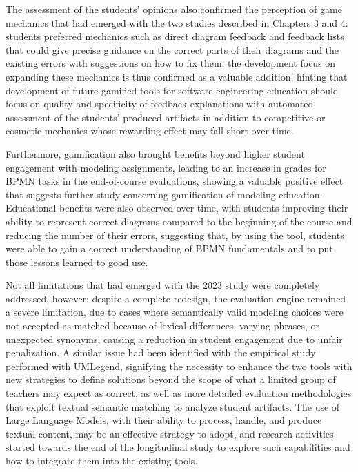 The assessment of the students' opinions also confirmed the perception of game mechanics that had emerged with the two studies described in Chapters 3 and 4: students preferred mechanics such as direct diagram feedback and feedback lists that could give precise guidance on the correct parts of their diagrams and the existing errors with suggestions on how to fix them; the development focus on expanding these mechanics is thus confirmed as a valuable addition, hinting that development of future gamified tools for software engineering education should focus on quality and specificity of feedback explanations with automated assessment of the students' produced artifacts in addition to competitive or cosmetic mechanics whose rewarding effect may fall short over time. 

Furthermore, gamification also brought benefits beyond higher student engagement with modeling assignments, leading to an increase in grades for BPMN tasks in the end-of-course evaluations, showing a valuable positive effect that suggests further study concerning gamification of modeling education. Educational benefits were also observed over time, with students improving their ability to represent correct diagrams compared to the beginning of the course and reducing the number of their errors, suggesting that, by using the tool, students were able to gain a correct understanding of BPMN fundamentals and to put those lessons learned to good use.

Not all limitations that had emerged with the 2023 study were completely addressed, however: despite a complete redesign, the evaluation engine remained a severe limitation, due to cases where semantically valid modeling choices were not accepted as matched because of lexical differences, varying phrases, or unexpected synonyms, causing a reduction in student engagement due to unfair penalization. A similar issue had been identified with the empirical study performed with UMLegend, signifying the necessity to enhance the two tools with new strategies to define solutions beyond the scope of what a limited group of teachers may expect as correct, as well as more detailed evaluation methodologies that exploit textual semantic matching to analyze student artifacts. The use of Large Language Models, with their ability to process, handle, and produce textual content, may be an effective strategy to adopt, and research activities started towards the end of the longitudinal study to explore such capabilities and how to integrate them into the existing tools.

